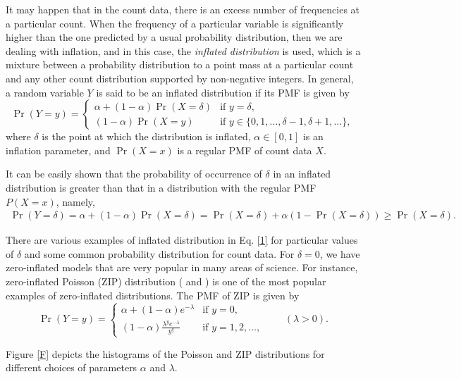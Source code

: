 \documentclass[twoside]{article}
\begin{document}
It may happen that in the count data, there is an excess number of frequencies at a particular count.  When the frequency of a particular variable is significantly higher than the one predicted by a usual probability distribution, then we are dealing with inflation, and in this case, the \textit{inflated distribution} is used, which is a mixture between a probability distribution to a point mass at a particular count and any other count distribution supported by non-negative integers.
In general, a random variable $Y$ is said to be an inflated distribution
if its PMF is given by
\begin{equation}\label{1}
	\Pr(Y=y)=\begin{cases}
		\alpha+(1-\alpha)\Pr(X=\delta) & \text{if $y=\delta$},\\
		(1-\alpha)\Pr(X=y)& \text{if $y\in\{0, 1, \dots, \delta-1, \delta+1, \dots\}$},
	\end{cases}
\end{equation}
where $\delta$ is the point at which the distribution is inflated, $\alpha\in[0,1]$ is an inflation parameter, and $\Pr(X=x)$ is a regular PMF of count data $X$. 


It can be easily shown that the probability of occurrence of $\delta$ in an inflated distribution is greater than that in a distribution with the regular PMF $P(X=x)$, namely,
\begin{align*}
	\Pr(Y=\delta)=\alpha+(1-\alpha)\Pr(X=\delta)=\Pr(X=\delta)+\alpha(1-\Pr(X=\delta))
	\geq \Pr(X=\delta).
\end{align*}


There are various examples of inflated distribution in Eq. \eqref{1} for particular values of $\delta$ and some common probability distribution for count data. For $\delta=0$, we have zero-inflated models that are very popular in many areas of science.  For instance, zero-inflated Poisson (ZIP) distribution (\cite{Cohen} and \cite{Lambert}) is one of the most popular examples of zero-inflated distributions. The PMF of ZIP is given by
\begin{equation*}
	\Pr(Y=y)=\begin{cases}
		\alpha+(1-\alpha)e^{-\lambda} & \text{if $y=0$},\\
		(1-\alpha)\frac{\lambda^ye^{-\lambda}}{y!}& \text{if $y=1, 2, \dots$},
	\end{cases}\qquad (\lambda>0).
\end{equation*}

 Figure \ref{F} depicts the histograms of the Poisson and ZIP distributions for different choices of parameters $\alpha$ and $\lambda$. 
 
\end{document}

